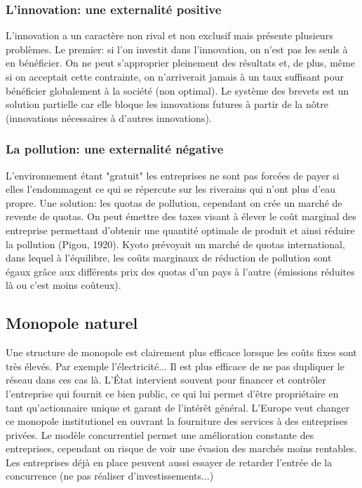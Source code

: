 \subsubsection{L'innovation: une externalité positive} %
\label{sub:l_innovation_une_externalite_positive}

L'innovation a un caractère non rival et non exclusif mais présente plusieurs problèmes. Le premier: si l'on investit dans l'innovation, on n'est pas les seuls à en bénéficier. On ne peut s'approprier pleinement des résultats et, de plus, même si on acceptait cette contrainte, on n'arriverait jamais à un taux suffisant pour bénéficier globalement à la société (non optimal). Le système des brevets est un solution partielle car elle bloque les innovations futures à partir de la nôtre (innovations nécessaires à d'autres innovations). 

\subsubsection{La pollution: une externalité négative} %
\label{sub:la_pollution_une_externalite_negative}

L'environnement étant "gratuit" les entreprises ne sont pas forcées de payer si elles l'endommagent ce qui se répercute sur les riverains qui n'ont plus d'eau propre. Une solution: les quotas de pollution, cependant on crée un marché de revente de quotas. On peut émettre des taxes visant à élever le coût marginal des entreprise permettant d'obtenir une quantité optimale de produit et ainsi réduire la pollution (Pigou, 1920). Kyoto prévoyait un marché de quotas international, dans lequel à l'équilibre, les coûts marginaux de réduction de pollution sont égaux grâce aux différents prix des quotas d'un pays à l'autre (émissions réduites là ou c'est moins coûteux).

\subsection{Monopole naturel} %
\label{sec:monopole_naturel}

Une structure de monopole est clairement plus efficace lorsque les coûts fixes sont très élevés. Par exemple l'électricité... Il est plus efficace de ne pas dupliquer le réseau dans ces cas là. L'État intervient souvent pour financer et contrôler l'entreprise qui fournit ce bien public, ce qui lui permet d'être propriétaire en tant qu'actionnaire unique et garant de l'intérêt général. L'Europe veut changer ce monopole institutionel en ouvrant la fourniture des services à des entreprises privées. Le modèle concurrentiel permet une amélioration constante des entreprises, cependant on risque de voir une évasion des marchés moins rentables. Les entreprises déjà en place peuvent aussi essayer de retarder l'entrée de la concurrence (ne pas réaliser d'investissements...)

